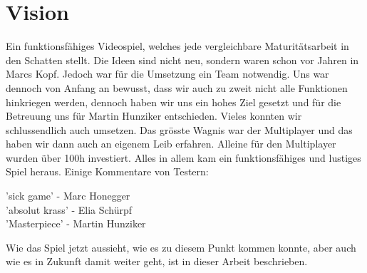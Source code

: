 \chapter{Vision}

Ein funktionsfähiges Videospiel, welches jede vergleichbare Maturitätsarbeit in den Schatten stellt.
Die Ideen sind nicht neu, sondern waren schon vor Jahren in Marcs Kopf.
Jedoch war für die Umsetzung ein Team notwendig.
Uns war dennoch von Anfang an bewusst,
dass wir auch zu zweit nicht alle Funktionen hinkriegen werden, dennoch haben wir uns ein hohes Ziel gesetzt und für die Betreuung uns für Martin Hunziker entschieden.
Vieles konnten wir schlussendlich auch umsetzen.
Das grösste Wagnis war der Multiplayer und das haben wir dann auch an eigenem Leib erfahren.
Alleine für den Multiplayer wurden über 100h investiert.
Alles in allem kam ein funktionsfähiges und lustiges Spiel heraus.
Einige Kommentare von Testern:
\begin{center}
    'sick game' - Marc Honegger \\
    'absolut krass' - Elia Schürpf \\ 
    'Masterpiece' - Martin Hunziker
\end{center}
Wie das Spiel jetzt aussieht, wie es zu diesem Punkt kommen konnte, aber auch wie es in Zukunft damit weiter geht, ist in dieser Arbeit beschrieben.